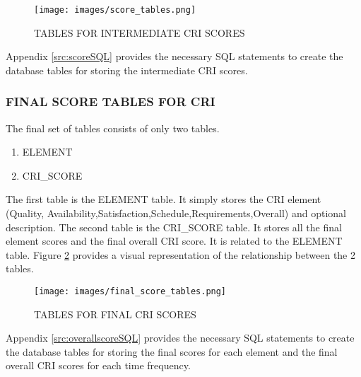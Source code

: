 \documentclass[SDSUThesis.tex]{subfiles}
\begin{document}
           \begin{figure}[htb]
                \centering
                \texttt{[image: images/score\_tables.png]}
                \caption{TABLES FOR INTERMEDIATE CRI SCORES}
                \label{fig:score_tables}
            \end{figure}%
            
            Appendix \ref{src:scoreSQL} provides the necessary SQL statements to create the 
            database tables for storing the intermediate CRI scores.
        
        \subsubsection{FINAL SCORE TABLES FOR CRI}
            The final set of tables consists of only two tables.  
            \begin{enumerate}
                \item ELEMENT
                \item CRI\_SCORE
            \end{enumerate}
            The first
            table is the ELEMENT table.  It simply stores the CRI element 
            (Quality, Availability,Satisfaction,Schedule,Requirements,Overall) and 
            optional description. The second table is the CRI\_SCORE table.  
            It stores all the final element scores and the final overall CRI
            score.  It is related to the ELEMENT table.  Figure 
            \ref{fig:final_score_tables} provides a visual representation of the 
            relationship between the 2 tables. 
            
           \begin{figure}[hbt]
                \centering
                \texttt{[image: images/final\_score\_tables.png]}
                \caption{TABLES FOR FINAL CRI SCORES}
                \label{fig:final_score_tables}
            \end{figure}
            
            
            Appendix \ref{src:overallscoreSQL} provides the necessary SQL 
            statements to create the 
            database tables for storing the final scores for each element and the final 
            overall CRI scores for each time frequency.
\end{document}

